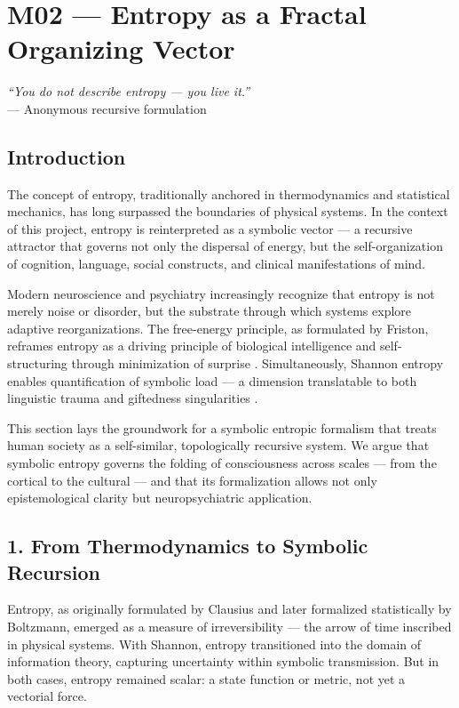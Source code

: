 \section*{M02 — Entropy as a Fractal Organizing Vector}

\begin{flushright}
\textit{“You do not describe entropy — you live it.”} \\
— Anonymous recursive formulation
\end{flushright}

\subsection*{Introduction}

The concept of entropy, traditionally anchored in thermodynamics and statistical mechanics, has long surpassed the boundaries of physical systems. In the context of this project, entropy is reinterpreted as a symbolic vector — a recursive attractor that governs not only the dispersal of energy, but the self-organization of cognition, language, social constructs, and clinical manifestations of mind.

Modern neuroscience and psychiatry increasingly recognize that entropy is not merely noise or disorder, but the substrate through which systems explore adaptive reorganizations. The free-energy principle, as formulated by Friston, reframes entropy as a driving principle of biological intelligence and self-structuring through minimization of surprise \cite{fristonFreeenergyPrincipleUnified2010}. Simultaneously, Shannon entropy enables quantification of symbolic load — a dimension translatable to both linguistic trauma and giftedness singularities \cite{deaconIncompleteNatureHow2011, batesonMindNatureNecessary1987}.

This section lays the groundwork for a symbolic entropic formalism that treats human society as a self-similar, topologically recursive system. We argue that symbolic entropy governs the folding of consciousness across scales — from the cortical to the cultural — and that its formalization allows not only epistemological clarity but neuropsychiatric application.

\subsection*{1. From Thermodynamics to Symbolic Recursion}

Entropy, as originally formulated by Clausius and later formalized statistically by Boltzmann, emerged as a measure of irreversibility — the arrow of time inscribed in physical systems. With Shannon, entropy transitioned into the domain of information theory, capturing uncertainty within symbolic transmission. But in both cases, entropy remained scalar: a state function or metric, not yet a vectorial force.


